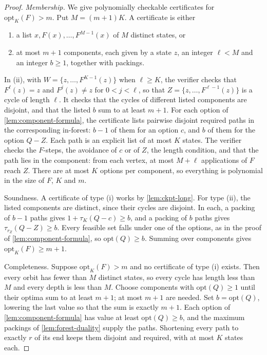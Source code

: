 \documentclass[11pt]{article}
\theoremstyle{definition}
\theoremstyle{remark}
\numberwithin{equation}{section}
\begin{document}
\begin{proof}
\emph{Membership.}  We give polynomially checkable certificates for
$\mathrm{opt}_K(F)>m$.  Put $M=(m+1)K$.  A certificate is either
\begin{enumerate}
\item[(i)] a list $x,F(x),\ldots,F^{M-1}(x)$ of $M$ distinct states, or
\item[(ii)] at most $m+1$ components, each given by a state $z$, an
  integer $\ell<M$ and an integer $b\geq1$, together with packings.
\end{enumerate}
In (ii), with $W=\{z,\ldots,F^{K-1}(z)\}$ when $\ell\geq K$, the
verifier checks that $F^\ell(z)=z$ and $F^j(z)\neq z$ for
$0<j<\ell$, so that $Z=\{z,\ldots,F^{\ell-1}(z)\}$ is a cycle of length
$\ell$.  It checks that the cycles of different listed components are
disjoint, and that the listed $b$ sum to at least $m+1$.  For each option
of \cref{lem:component-formula}, the certificate lists pairwise disjoint
required paths in the corresponding in-forest: $b-1$ of them for an
option $c$, and $b$ of them for the option $Q-Z$.  Each path is an
explicit list of at most $K$ states.  The verifier checks the $F$-steps,
the avoidance of $c$ or of $Z$, the length condition, and that the
path lies in the component: from each vertex, at most $M+\ell$
applications of $F$ reach $Z$.  There are at most $K$ options per
component, so everything is polynomial in the size of $F$, $K$ and $m$.

Soundness.  A certificate of type (i) works by \cref{lem:ckpt-long}.
For type (ii), the listed components are distinct, since their cycles are
disjoint.  In each, a packing of $b-1$ paths gives
$1+\tau_K(Q-c)\geq b$, and a packing of $b$ paths gives
$\tau_{r_Z}(Q-Z)\geq b$.  Every feasible set falls under one of the
options, as in the proof of \cref{lem:component-formula}, so
$\mathrm{opt}(Q)\geq b$.  Summing over components gives
$\mathrm{opt}_K(F)\geq m+1$.

Completeness.  Suppose $\mathrm{opt}_K(F)>m$ and no certificate of type
(i) exists.  Then every orbit has fewer than $M$ distinct states, so
every cycle has length less than $M$ and every depth is less than $M$.
Choose components with $\mathrm{opt}(Q)\geq1$ until their optima sum to
at least $m+1$; at most $m+1$ are needed.  Set $b=\mathrm{opt}(Q)$,
lowering the last value so that the sum is exactly $m+1$.  Each option of
\cref{lem:component-formula} has value at least $\mathrm{opt}(Q)\geq b$,
and the maximum packings of \cref{lem:forest-duality} supply the paths.
Shortening every path to exactly $r$ of its end keeps them disjoint and
required, with at most $K$ states each.


\end{proof}
\end{document}
